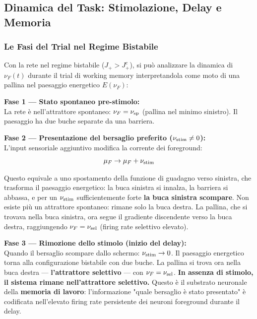 \subsection{Dinamica del Task: Stimolazione, Delay e Memoria}

\subsubsection{Le Fasi del Trial nel Regime Bistabile}

Con la rete nel regime bistabile ($J_+ > J_+^c$), si può analizzare la dinamica di $\nu_F(t)$ durante il trial di working memory interpretandola come moto di una pallina nel paesaggio energetico $E(\nu_F)$:

\textbf{Fase 1 — Stato spontaneo pre-stimolo:}\\
La rete è nell'attrattore spontaneo: $\nu_F = \nu_{\rm sp}$ (pallina nel minimo sinistro). Il paesaggio ha due buche separate da una barriera.

\textbf{Fase 2 — Presentazione del bersaglio preferito ($\nu_{\rm stim} \neq 0$):}\\
L'input sensoriale aggiuntivo modifica la corrente dei foreground:
\begin{equation}
\mu_F \to \mu_F + \nu_{\rm stim}
\end{equation}

Questo equivale a uno spostamento della funzione di guadagno verso sinistra, che trasforma il paesaggio energetico: la buca sinistra si innalza, la barriera si abbassa, e per un $\nu_{\rm stim}$ sufficientemente forte \textbf{la buca sinistra scompare}. Non esiste più un attrattore spontaneo: rimane solo la buca destra. La pallina, che si trovava nella buca sinistra, ora segue il gradiente discendente verso la buca destra, raggiungendo $\nu_F = \nu_{\rm sel}$ (firing rate selettivo elevato).

\textbf{Fase 3 — Rimozione dello stimolo (inizio del delay):}\\
Quando il bersaglio scompare dallo schermo: $\nu_{\rm stim} \to 0$. Il paesaggio energetico torna alla configurazione bistabile con due buche. La pallina si trova ora nella buca destra — \textbf{l'attrattore selettivo} — con $\nu_F = \nu_{\rm sel}$. \textbf{In assenza di stimolo, il sistema rimane nell'attrattore selettivo.} Questo è il substrato neuronale della \textbf{memoria di lavoro}: l'informazione "quale bersaglio è stato presentato" è codificata nell'elevato firing rate persistente dei neuroni foreground durante il delay.

